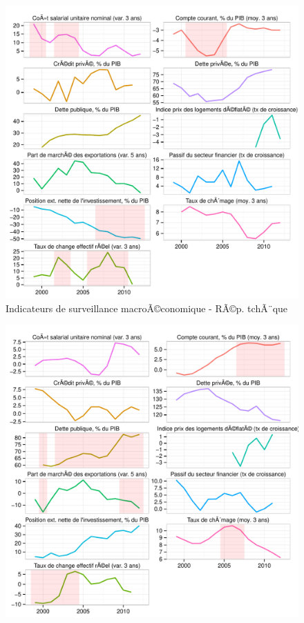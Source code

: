 \documentclass{article}\usepackage[]{graphicx}\usepackage[]{color}
\makeatletter
\def\maxwidth{ %
  \ifdim\Gin@nat@width>\linewidth
    \linewidth
  \else
    \Gin@nat@width
  \fi
}
\newenvironment{knitrout}{}{} %
\makeatother
\begin{document}
\begin{knitrout}
\begin{figure}[p]
{\centering \includegraphics[width=\maxwidth]{figure_graph/byco5} 

}

\caption[Indicateurs de surveillance macroÃ©conomique - RÃ©p]{Indicateurs de surveillance macroÃ©conomique - RÃ©p. tchÃ¨que\label{fig:byco5}}
\end{figure}

\begin{figure}[p]


{\centering \includegraphics[width=\maxwidth]{figure_graph/byco6} 

}
\end{figure}
\end{knitrout}
\end{document}
